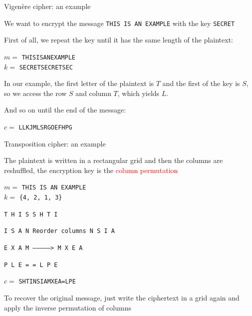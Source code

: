 \begin{frame}{Vigenère cipher: an example}
  
  We want to encrypt the message \texttt{THIS IS AN EXAMPLE} with the key \texttt{SECRET}

  \medskip
  
  First of all, we repeat the key until it has the same length of the plaintext: \\

  \medskip
  
  $m =$ \texttt{THISISANEXAMPLE}\\
  $k =$ \texttt{SECRETSECRETSEC}\\

  \medskip
  
  In our example, the first letter of the plaintext is $T$ and the first of the key is $S$, so we access the row $S$ and column $T$, which yields $L$. 
  
  And so on until the end of the message:\\

  \medskip
  
  $c =$ \texttt{LLKJMLSRGOEFHPG}

\end{frame}
\begin{frame}{Transposition cipher: an example}

The plaintext is written in a rectangular grid and then the columns are reshuffled, the encryption key is the \textcolor{red}{column permutation}

\medskip

$m =$ \texttt{THIS IS AN EXAMPLE}\\
$k =$ \texttt{\{4, 2, 1, 3\}}

\medskip

\centerline{\texttt{T H I S  \phantom{-------------------->} S H T I}}
\centerline{\texttt{I S A N  \phantom{---}Reorder columns\phantom{---} N S I A}}
\centerline{\texttt{E X A M  \phantom{---}-------------->\phantom{---} M X E A}}
\centerline{\texttt{P L E =  \phantom{-------------------->} = L P E}}

\medskip

$c =$ \texttt{SHTINSIAMXEA=LPE}

\medskip

To recover the original message, just write the ciphertext in a grid again and apply the inverse permutation of columns

\end{frame}
